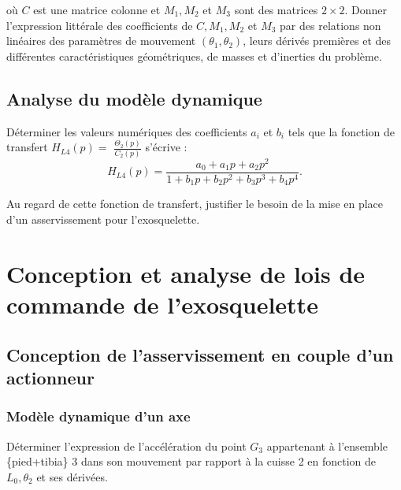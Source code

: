 \documentclass[11pt]{article}
\begin{document}
où $C$ est une matrice colonne et $M_{1}, M_{2}$ et $M_{3}$ sont des matrices $2 \times 2$. Donner l'expression littérale des coefficients de $C, M_{1}, M_{2}$ et $M_{3}$ par des relations non linéaires des paramètres de mouvement $\left(\theta_{1}, \theta_{2}\right)$, leurs dérivés premières et des différentes caractéristiques géométriques, de masses et d'inerties du problème.
\begin{UPSTIcorrige}

\end{UPSTIcorrige}


\subsection{Analyse du modèle dynamique}

\UPSTIquestion Déterminer les valeurs numériques des coefficients $a_{i}$ et $b_{i}$ tels que la fonction de transfert $H_{L 4}(p)=$ $\frac{\Theta_{2}(p)}{C_{2}(p)}$ s'écrive :
$$
H_{L 4}(p)=\frac{a_{0}+a_{1} p+a_{2} p^{2}}{1+b_{1} p+b_{2} p^{2}+b_{3} p^{3}+b_{4} p^{4}}.
$$
\begin{UPSTIcorrige}

\end{UPSTIcorrige}


\UPSTIquestion Au regard de cette fonction de transfert, justifier le besoin de la mise en place d'un asservissement pour l'exosquelette.
\begin{UPSTIcorrige}

\end{UPSTIcorrige}

\section{Conception et analyse de lois de commande de l’exosquelette}
\subsection{Conception de l'asservissement en couple d'un actionneur}

\subsubsection{Modèle dynamique d'un axe}

\UPSTIquestion Déterminer l'expression de l'accélération du point $G_{3}$ appartenant à l'ensemble \{pied+tibia\} 3 dans son mouvement par rapport à la cuisse 2 en fonction de $L_{0}, \theta_{2}$ et ses dérivées.
\begin{UPSTIcorrige}

\end{UPSTIcorrige}
\end{document}
